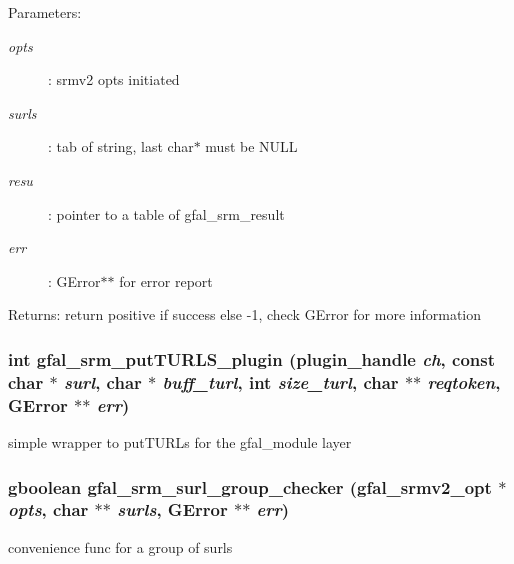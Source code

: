 \begin{Desc}
\item[Parameters:]
\begin{description}
\item[{\em opts}]: srmv2 opts initiated \item[{\em surls}]: tab of string, last char$\ast$ must be NULL \item[{\em resu}]: pointer to a table of gfal\_\-srm\_\-result \item[{\em err}]: GError$\ast$$\ast$ for error report \end{description}
\end{Desc}
\begin{Desc}
\item[Returns:]return positive if success else -1, check GError for more information \end{Desc}
\subsubsection{\setlength{\rightskip}{0pt plus 5cm}int gfal\_\-srm\_\-put\-TURLS\_\-plugin (plugin\_\-handle {\em ch}, const char $\ast$ {\em surl}, char $\ast$ {\em buff\_\-turl}, int {\em size\_\-turl}, char $\ast$$\ast$ {\em reqtoken}, GError $\ast$$\ast$ {\em err})}\label{gfal__common__srm__internal__layer_8h_24220c90dc2c2c7b43544c77bfac96cb}


simple wrapper to put\-TURLs for the gfal\_\-module layer 
\subsubsection{\setlength{\rightskip}{0pt plus 5cm}gboolean gfal\_\-srm\_\-surl\_\-group\_\-checker (gfal\_\-srmv2\_\-opt $\ast$ {\em opts}, char $\ast$$\ast$ {\em surls}, GError $\ast$$\ast$ {\em err})}\label{gfal__common__srm__internal__layer_8h_06188f12a730a8eafa7be73c312daae8}


convenience func for a group of surls 